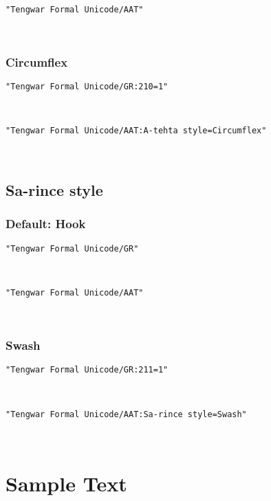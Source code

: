 \documentclass[11pt,a4paper]{article}
\begin{document}
\formalGR 

\noindent \texttt{"Tengwar Formal Unicode/AAT"}

\formalAAT 

\subsubsection{Circumflex}

\texttt{"Tengwar Formal Unicode/GR:210=1"}

\formalGRcircumflex 

\noindent \texttt{"Tengwar Formal Unicode/AAT:A-tehta style=Circumflex"}

\formalAATcircumflex 


\subsection{Sa-rince style}

\subsubsection{Default: Hook}

\texttt{"Tengwar Formal Unicode/GR"}

\formalGR 

\noindent \texttt{"Tengwar Formal Unicode/AAT"}

\formalAAT 

\subsubsection{Swash}

\texttt{"Tengwar Formal Unicode/GR:211=1"}

\formalGRswash 

\noindent \texttt{"Tengwar Formal Unicode/AAT:Sa-rince style=Swash"}

\formalAATswash 


\newpage

\section{Sample Text}
\end{document}
